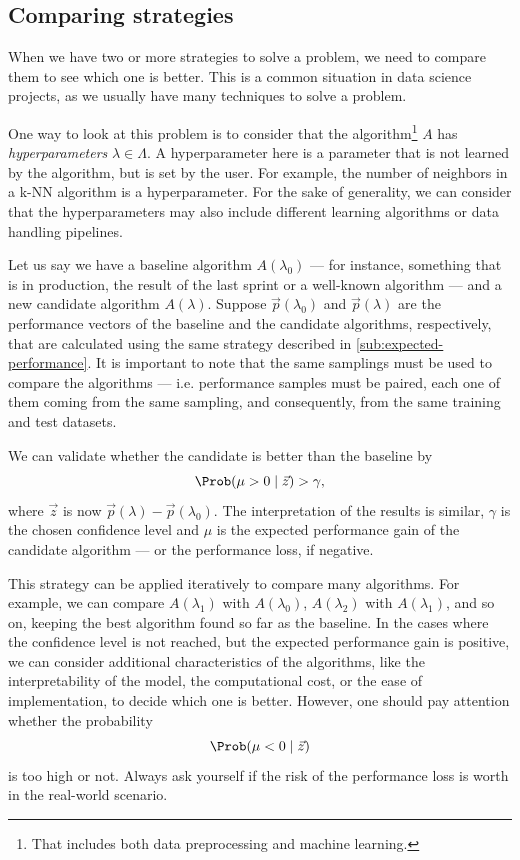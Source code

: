\subsection{Comparing strategies}
\label{sub:comparison}

When we have two or more strategies to solve a problem, we need to compare them to see
which one is better.  This is a common situation in data science projects, as we usually
have many techniques to solve a problem.

One way to look at this problem is to consider that the algorithm\footnote{That includes
both data preprocessing and machine learning.} $A$ has \emph{hyperparameters} $\lambda \in
\Lambda$.  A hyperparameter here is a parameter that is not learned by the algorithm, but
is set by the user.  For example, the number of neighbors in a k-NN algorithm is a
hyperparameter.  For the sake of generality, we can consider that the hyperparameters may
also include different learning algorithms or data handling pipelines.

Let us say we have a baseline algorithm $A(\lambda_0)$ --- for instance, something that is
in production, the result of the last sprint or a well-known algorithm --- and a new candidate algorithm $A(\lambda)$.
Suppose $\vec{p}(\lambda_0)$ and $\vec{p}(\lambda)$ are the performance vectors of the
baseline and the candidate algorithms, respectively, that are calculated using the same
strategy described in \cref{sub:expected-performance}.  It is important to note that the
same samplings must be used to compare the algorithms --- i.e. performance samples must be
paired, each one of them coming from the same sampling, and consequently, from the same
training and test datasets.

We can validate whether the
candidate is better than the baseline by
\begin{equation*}
  \Prob(\mu > 0 \mid \vec{z}) > \gamma\text{,}
\end{equation*}
where $\vec{z}$ is now $\vec{p}(\lambda) - \vec{p}(\lambda_0)$.  The interpretation of the
results is similar, $\gamma$ is the chosen confidence level and $\mu$ is the expected
performance gain of the candidate algorithm --- or the performance loss, if negative.

This strategy can be applied iteratively to compare many algorithms.  For example, we can
compare $A(\lambda_1)$ with $A(\lambda_0)$, $A(\lambda_2)$ with $A(\lambda_1)$, and so on,
keeping the best algorithm found so far as the baseline. In the cases where the confidence
level is not reached, but the expected performance gain is positive, we can consider
additional characteristics of the algorithms, like the interpretability of the model, the
computational cost, or the ease of implementation, to decide which one is better. However,
one should pay attention whether the probability
\begin{equation*}
  \Prob(\mu < 0 \mid \vec{z})
\end{equation*}
is too high or not.  Always ask yourself if the risk of the performance loss is worth in
the real-world scenario.

